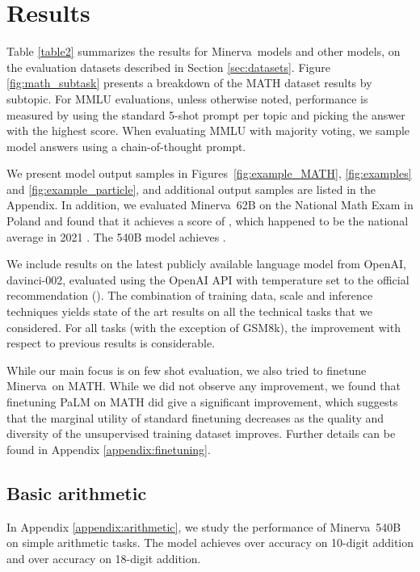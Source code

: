 \documentclass{article}
\newcommand{\ourmodel}[0]{{Minerva~}}
\newcommand{\pretrainedmodel}{{PaLM }}
\begin{document}
\section{Results}
\label{sec:results}


Table \ref{table2} summarizes the results for \ourmodel models and other models, on the evaluation datasets described in Section \ref{sec:datasets}.
Figure \ref{fig:math_subtask} presents a breakdown of the MATH dataset results by subtopic. For MMLU evaluations, unless otherwise noted, performance is measured by using the standard 5-shot prompt per topic and picking the answer with the highest score. When evaluating MMLU with majority voting, we sample  model answers using a chain-of-thought prompt.

We present model output samples in Figures~\ref{fig:example_MATH}, \ref{fig:examples} and \ref{fig:example_particle}, and additional output samples are listed in the Appendix. In addition, we evaluated \ourmodel 62B 
on the National Math Exam in Poland and found that it achieves a score of , which happened to be the national average in 2021 \citep[p.~23]{cke_results}. The 540B model achieves .


We include results on the latest publicly available language model from OpenAI, davinci-002, evaluated using the OpenAI API with temperature set to the official recommendation (). 
The combination of training data, scale and inference techniques yields state of the art results on all the technical tasks that we considered. For all tasks (with the exception of GSM8k), the improvement with respect to previous results is considerable.

While our main focus is on few shot evaluation,  we also tried to finetune \ourmodel on MATH. While we did not observe any improvement, we found that finetuning \pretrainedmodel on MATH did give a significant  improvement, which suggests that the marginal utility of standard finetuning decreases as the quality and diversity of the unsupervised training dataset improves. Further details can be found in Appendix \ref{appendix:finetuning}. 

\subsection{Basic arithmetic}
In Appendix \ref{appendix:arithmetic}, we study the performance of \ourmodel 540B on simple arithmetic tasks. The model achieves over  accuracy on 10-digit addition and over  accuracy on 18-digit addition.  
\end{document}
